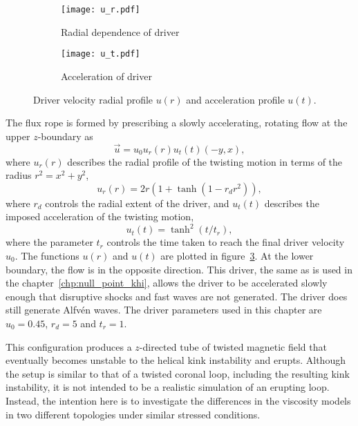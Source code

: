 \begin{figure}[t]
  \centering
  \begin{subfigure}{.49\textwidth}
  \centering
  \texttt{[image: u\_r.pdf]}
  \caption{Radial dependence of driver}
  \label{fig:kink_radial_driver}
  \end{subfigure}
  \begin{subfigure}{.49\textwidth}
  \centering
  \texttt{[image: u\_t.pdf]}
  \caption{Acceleration of driver}
  \label{fig:kink_driver_accel}
  \end{subfigure}
  
  \caption{Driver velocity radial profile $u(r)$ and acceleration profile $u(t)$.}
  \label{fig:kink_driver}
\end{figure}


The flux rope is formed by prescribing a slowly accelerating, rotating flow at the upper $z$-boundary as
\begin{equation}
  \label{eq:null_twisting_profile}
  \vec{u} = u_0 u_r(r) u_t(t) (-y, x),
\end{equation}
where $u_r(r)$ describes the radial profile of the twisting motion in terms of the radius $r^2 = x^2 + y^2$,
\begin{equation}
  \label{eq:radial_twisting_function}
  u_r(r) = 2r(1 + \tanh(1 - r_d r^2)),
\end{equation}
where $r_d$ controls the radial extent of the driver, and $u_t(t)$ describes the imposed acceleration of the twisting motion,
\begin{equation}
  \label{eq:ramping_up_function}
  u_t(t) = \tanh^2(t/t_r),
\end{equation}
where the parameter $t_r$ controls the time taken to reach the final driver velocity $u_0$. The functions $u(r)$ and $u(t)$ are plotted in figure~\ref{fig:kink_driver}. At the lower boundary, the flow is in the opposite direction. This driver, the same as is used in the chapter~\ref{chp:null_point_khi}, allows the driver to be accelerated slowly enough that disruptive shocks and fast waves are not generated. The driver does still generate Alfv\'en waves. The driver parameters used in this chapter are $u_0 = 0.45$, $r_d = 5$ and $t_r = 1$.

This configuration produces a $z$-directed tube of twisted magnetic field that eventually becomes unstable to the helical kink instability and erupts. Although the setup is similar to that of a twisted coronal loop, including the resulting kink instability, it is not intended to be a realistic simulation of an erupting loop. Instead, the intention here is to investigate the differences in the viscosity models in two different topologies under similar stressed conditions.

